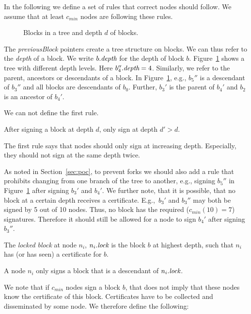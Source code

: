 
\noindent
In the following we define a set of rules that correct nodes should follow. We assume that at least $c_{min}$ nodes are following these rules.

\begin{figure}
	\centering
	
\caption{Blocks in a tree and depth $d$ of blocks.}
\label{fig:tree}
\end{figure}

The \emph{previousBlock} pointers create a tree structure on blocks. We can thus refer to the \emph{depth} of a block. We write $b.\textit{depth}$ for the depth of block $b$. Figure~\ref{fig:tree} shows a tree with different depth levels. Here $b_4''.\textit{depth}=4$. Similarly, we refer to the parent, ancestors or descendants of a block. In Figure~\ref{fig:tree}, e.g., $b_5''$ is a descendant of $b_3''$ and all blocks are descendants of $b_0$. Further, $b_3'$ is the parent of $b_4'$ and $b_2$ is an ancestor of $b_4'$. 

We can not define the first rule.
\begin{Rule}
After signing a block at depth $d$, only sign at depth $d'>d$.
\end{Rule}
\noindent
The first rule says that nodes should only sign at increasing depth. Especially, they should not sign at the same depth twice.

As noted in Section~\ref{sec:poc}, to prevent forks we should also add a rule that prohibits changing from one branch of the tree to another, e.g., signing  $b_5''$ in Figure~\ref{fig:tree} after signing $b_3'$ and $b_4'$.
%
We further note, that it is possible, that no block at a certain depth receives a certificate. E.g.,~$b_3'$ and $b_3''$ may both be signed by 5 out of 10 nodes. Thus, no block has the required ($c_{min}(10)=7$) signatures.  
%
Therefore it should still be allowed for a node to sign $b_4'$ after signing $b_3''$. 
%

\begin{definition}The \emph{locked block} at node $n_i$, $n_i.\textit{lock}$ is the block $b$ at highest depth, such that $n_i$ has (or has seen) a certificate for $b$.
\end{definition}

\begin{Rule} 
	A node $n_i$ only signs a block that is a descendant of $n_i.\textit{lock}$.	
\end{Rule}

We note that if $c_{min}$ nodes sign a block $b$, that does not imply that these nodes know the certificate of this block. Certificates have to be collected and disseminated by some node. We therefore define the following:


